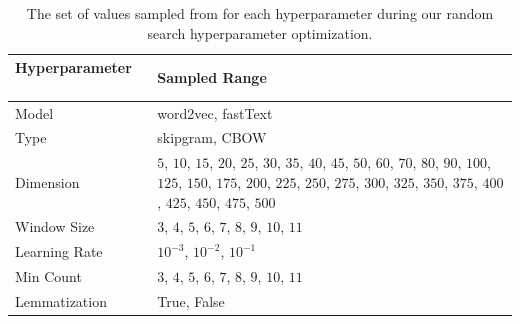 \documentclass[11pt,a4paper]{article}
\DeclareMathOperator{\OddOneOut}{\texttt{OddOneOut}}
\DeclareMathOperator{\topk}{\texttt{Topk}}
\begin{document}
\begin{table}
    \centering
   \begin{tabular}{lp{4cm}}
    \toprule
    Hyperparameter ~~~ & Sampled Range \\
   \midrule
   Model & word2vec, fastText \\ [4pt]
   Type & skipgram, CBOW \\ [4pt]
   Dimension & $5$, $10$, $15$, $20$, $25$, $30$, $35$, $40$, $45$, $50$,
                          $60$, $70$, $80$, $90$, $100$,
                          $125$, $150$, $175$, $200$, $225$, $250$, $275$, $300$, $325$, $350$, $375$, $400$, $425$, $450$, $475$, $500$ \\[4pt]
   Window Size & $3$, $4$, $5$, $6$, $7$, $8$, $9$, $10$, $11$ \\ [4pt]
   Learning Rate & $10^{-3}$, $10^{-2}$, $10^{-1}$ \\ [4pt]
   Min Count & $3$, $4$, $5$, $6$, $7$, $8$, $9$, $10$, $11$ \\ [4pt]
   Lemmatization & True, False \\ [2pt]
   \bottomrule
    \end{tabular}
    \caption{The set of values sampled from for each hyperparameter during our random search hyperparameter optimization.}
    \label{table:hyperparam}
\end{table}
\end{document}
